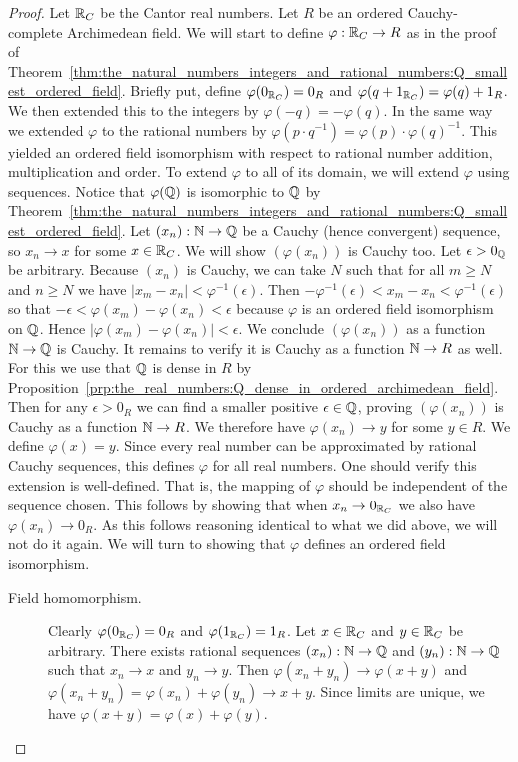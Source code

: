 \documentclass[../main.tex]{subfiles}
\begin{document}
\begin{proof}
    Let $\mathbb{R}_C$ be the Cantor real numbers. Let $R$ be an ordered Cauchy-complete Archimedean field. We will start to define $\varphi:\mathbb{R}_C\to R$ as in the proof of Theorem~\ref{thm:the_natural_numbers_integers_and_rational_numbers:Q_smallest_ordered_field}. Briefly put, define $\varphi(0_{\mathbb{R}_C})=0_R$ and $\varphi(q+1_{\mathbb{R}_C})=\varphi(q)+1_R$. We then extended this to the integers by $\varphi(-q)=-\varphi(q)$. In the same way we extended $\varphi$ to the rational numbers by $\varphi(p\cdot q^{-1})=\varphi(p)\cdot\varphi(q)^{-1}$. This yielded an ordered field isomorphism with respect to rational number addition, multiplication and order. To extend $\varphi$ to all of its domain, we will extend $\varphi$ using sequences. Notice that $\varphi(\mathbb{Q})$ is isomorphic to $\mathbb{Q}$ by Theorem~\ref{thm:the_natural_numbers_integers_and_rational_numbers:Q_smallest_ordered_field}. Let $(x_n):\mathbb{N}\to\mathbb{Q}$ be a Cauchy (hence convergent) sequence, so $x_n\to x$ for some $x\in\mathbb{R}_C$. We will show $(\varphi(x_n))$ is Cauchy too. Let $\epsilon>0_{\mathbb{Q}}$ be arbitrary. Because $(x_n)$ is Cauchy, we can take $N$ such that for all $m\geq N$ and $n\geq N$ we have $\vert x_m-x_n\vert<\varphi^{-1}(\epsilon)$. Then $-\varphi^{-1}(\epsilon)<x_m-x_n<\varphi^{-1}(\epsilon)$ so that $-\epsilon<\varphi(x_m)-\varphi(x_n)<\epsilon$ because $\varphi$ is an ordered field isomorphism on $\mathbb{Q}$. Hence $\vert\varphi(x_m)-\varphi(x_n)\vert<\epsilon$. We conclude $(\varphi(x_n))$ as a function $\mathbb{N}\to\mathbb{Q}$ is Cauchy. It remains to verify it is Cauchy as a function $\mathbb{N}\to R$ as well. For this we use that $\mathbb{Q}$ is dense in $R$ by Proposition~\ref{prp:the_real_numbers:Q_dense_in_ordered_archimedean_field}. Then for any $\epsilon>0_R$ we can find a smaller positive $\epsilon\in\mathbb{Q}$, proving $(\varphi(x_n))$ is Cauchy as a function $\mathbb{N}\to R$. We therefore have $\varphi(x_n)\to y$ for some $y\in R$. We define $\varphi(x)=y$. Since every real number can be approximated by rational Cauchy sequences, this defines $\varphi$ for all real numbers. One should verify this extension is well-defined. That is, the mapping of $\varphi$ should be independent of the sequence chosen. This follows by showing that when $x_n\to0_{\mathbb{R}_C}$ we also have $\varphi(x_n)\to0_R$. As this follows reasoning identical to what we did above, we will not do it again. We will turn to showing that $\varphi$ defines an ordered field isomorphism.
    \begin{description}
        \item[Field homomorphism.] Clearly $\varphi(0_{\mathbb{R}_C})=0_R$ and $\varphi(1_{\mathbb{R}_C})=1_R$. Let $x\in\mathbb{R}_C$ and $y\in\mathbb{R}_C$ be arbitrary. There exists rational sequences $(x_n):\mathbb{N}\to\mathbb{Q}$ and $(y_n):\mathbb{N}\to\mathbb{Q}$ such that $x_n\to x$ and $y_n\to y$. Then $\varphi(x_n+y_n)\to\varphi(x+y)$ and $\varphi(x_n+y_n)=\varphi(x_n)+\varphi(y_n)\to x+y$. Since limits are unique, we have $\varphi(x+y)=\varphi(x)+\varphi(y)$.


\end{description}
\end{proof}
\end{document}
